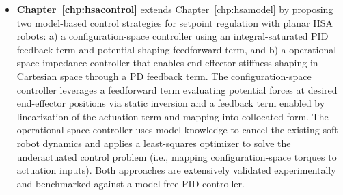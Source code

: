 \begin{itemize}
    \item \textbf{Chapter~\ref{chp:hsacontrol}} extends Chapter~\ref{chp:hsamodel} by proposing two model-based control strategies for setpoint regulation with planar \gls{HSA} robots: a) a configuration-space controller using an integral-saturated PID feedback term and potential shaping feedforward term, and b) a operational space impedance controller that enables end-effector stiffness shaping in Cartesian space through a PD feedback term. The configuration-space controller leverages a feedforward term evaluating potential forces at desired end-effector positions via static inversion and a feedback term enabled by linearization of the actuation term and mapping into collocated form. The operational space controller uses model knowledge to cancel the existing soft robot dynamics and applies a least-squares optimizer to solve the underactuated control problem (i.e., mapping configuration-space torques to actuation inputs). Both approaches are extensively validated experimentally and benchmarked against a model-free PID controller.  

\end{itemize}
